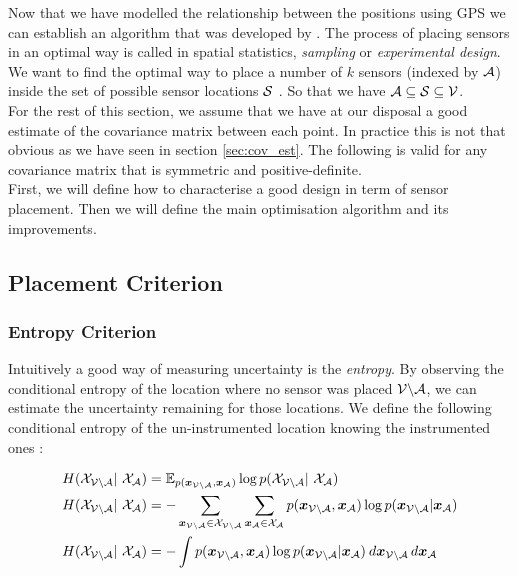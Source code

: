 Now that we have modelled the relationship between the positions using GPS we can establish an algorithm that was developed by \citet{krause_near-optimal_2008}. The process of placing sensors in an optimal way is called in spatial statistics, \textit{sampling} or \textit{experimental design}. We want to find the optimal way to place a number of $k$ sensors (indexed by $\A$) inside the set of possible sensor locations $\S$ . So that we have $\A \subseteq \S \subseteq \V$. \\


For the rest of this section, we assume that we have at our disposal a good estimate of the covariance matrix between each point. In practice this is not that obvious as we have seen in section \ref{sec:cov_est}. The following is valid for any covariance matrix that is symmetric and positive-definite. \\ 

First, we will define how to characterise a good design in term of sensor placement. Then we will define the main optimisation algorithm and its improvements. \\ 

\subsection{Placement Criterion}

\subsubsection{Entropy Criterion}

Intuitively a good way of measuring uncertainty is the \textit{entropy}. By observing the conditional entropy of the location where no sensor was placed $\VA$, we can estimate the uncertainty remaining for those locations. We define the following conditional entropy of the un-instrumented location knowing the instrumented ones \citep[p.~16]{cover_elements_1991} :

\begin{align}
    H(\X_{\VA} | \X_\A) &= \mathbb{E}_{p(\vec{x}_{\VA},\vec{x}_\A)} \log p(\X_{\VA} | \X_\A) \\
    H(\X_{\VA} | \X_\A) &= - \sum_{\vec{x}_{\VA} \in \X_{\VA}}\sum_{\vec{x}_{\A} \in \X_{\A}} p(\vec{x}_{\VA},\vec{x}_\A) \log p(\vec{x}_{\VA}|\vec{x}_\A) \\
    H(\X_{\VA} | \X_\A) &= - \int p(\vec{x}_{\VA},\vec{x}_\A) \log p(\vec{x}_{\VA}|\vec{x}_\A) \: d\vec{x}_{\VA} \, d\vec{x}_\A 
\end{align}

